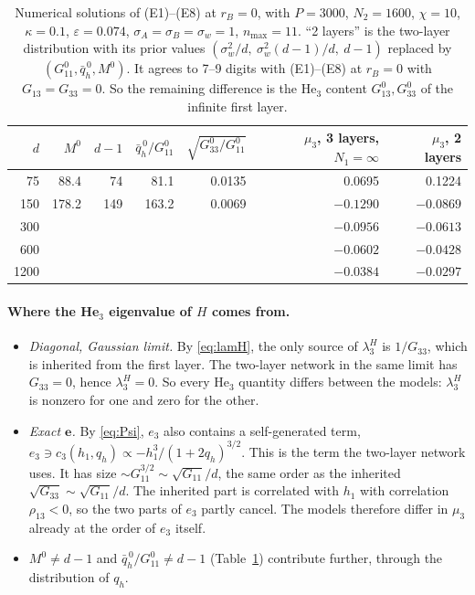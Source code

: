 \documentclass[11pt,a4paper]{article}
\begin{document}
\begin{table}[!htbp]
\centering
\small
\begin{tabular}{@{}rrrrrrr@{}}
\toprule
$d$ & $M^0$ & $d-1$ & $\bar q^{\,0}_h/G^0_{11}$ & $\sqrt{G^0_{33}/G^0_{11}}$ & $\mu_3$, 3 layers, $N_1=\infty$ & $\mu_3$, 2 layers\\
\midrule
75  & 88.4  & 74  & 81.1  & 0.0135 & 0.0695  & 0.1224\\
150 & 178.2 & 149 & 163.2 & 0.0069 & $-0.1290$ & $-0.0869$\\
300 &       &     &       &        & $-0.0956$ & $-0.0613$\\
600 &       &     &       &        & $-0.0602$ & $-0.0428$\\
1200&       &     &       &        & $-0.0384$ & $-0.0297$\\
\bottomrule
\end{tabular}
\caption{Numerical solutions of (E1)--(E8) at $r_B=0$, with $P=3000$, $N_2=1600$, $\chi=10$, $\kappa=0.1$, $\varepsilon=0.074$,
$\sigma_A=\sigma_B=\sigma_w=1$, $n_{\max}=11$.
``2 layers'' is the two-layer distribution with its prior values $(\sigma_w^2/d,\ \sigma_w^2(d-1)/d,\ d-1)$ replaced by $(G^0_{11},\bar q^{\,0}_h,M^0)$.
It agrees to 7--9 digits with (E1)--(E8) at $r_B=0$ with $G_{13}=G_{33}=0$.
So the remaining difference is the He$_3$ content $G^0_{13},G^0_{33}$ of the infinite first layer.}
\label{tab:limit}
\end{table}

\paragraph{Where the He$_3$ eigenvalue of $H$ comes from.}
\begin{itemize}
  \item \emph{Diagonal, Gaussian limit.} By \eqref{eq:lamH}, the only source of $\lambda^H_3$ is $1/G_{33}$, which is inherited from the first layer.
    The two-layer network in the same limit has $G_{33}=0$, hence $\lambda^H_3=0$.
    So every He$_3$ quantity differs between the models: $\lambda^H_3$ is nonzero for one and zero for the other.
  \item \emph{Exact $\mathbf e$.} By \eqref{eq:Psi}, $e_3$ also contains a self-generated term,
    $e_3\ni c_3(h_1,q_h)\propto-h_1^3/(1+2q_h)^{3/2}$.
    This is the term the two-layer network uses.
    It has size $\sim G_{11}^{3/2}\sim\sqrt{G_{11}}/d$, the same order as the inherited $\sqrt{G_{33}}\sim\sqrt{G_{11}}/d$.
    The inherited part is correlated with $h_1$ with correlation $\rho_{13}<0$, so the two parts of $e_3$ partly cancel.
    The models therefore differ in $\mu_3$ already at the order of $e_3$ itself.
  \item $M^0\neq d-1$ and $\bar q^{\,0}_h/G^0_{11}\neq d-1$ (Table~\ref{tab:limit}) contribute further, through the distribution of $q_h$.
\end{itemize}
\end{document}
